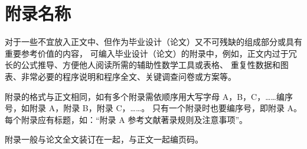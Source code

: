 \chapter{附录名称}

对于一些不宜放入正文中、但作为毕业设计（论文）又不可残缺的组成部分或具有重要参考价值的内容，
可编入毕业设计（论文）的附录中，例如，正文内过于冗长的公式推导、方便他人阅读所需的辅助性数学工具或表格、
重复性数据和图表、非常必要的程序说明和程序全文、关键调查问卷或方案等。

附录的格式与正文相同，如有多个附录需依顺序用大写字母 A，B，C，……编序号，如附录 A，附录 B，附录 C，……。
只有一个附录时也要编序号，即附录 A。每个附录应有标题，如：“附录 A 参考文献著录规则及注意事项”。

附录一般与论文全文装订在一起，与正文一起编页码。
